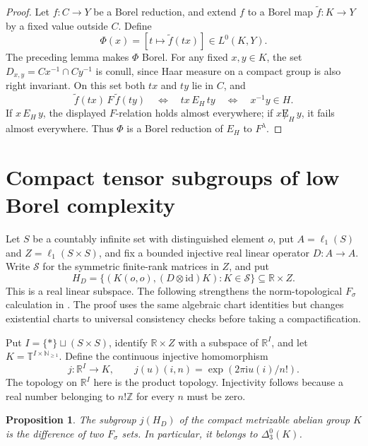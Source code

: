 \documentclass[11pt]{article}
\newtheorem{proposition}[theorem]{Proposition}
\theoremstyle{definition}
\theoremstyle{remark}
\newcommand{\R}{\mathbb R}
\newcommand{\N}{\mathbb N}
\newcommand{\T}{\mathbb T}
\newcommand{\Lzero}{L^0}
\begin{document}
\begin{proof}
Let $f:C\to Y$ be a Borel reduction, and extend $f$ to a Borel map
$\widetilde f:K\to Y$ by a fixed value outside $C$. Define
\[
 \Phi(x)=[t\mapsto\widetilde f(tx)]\in\Lzero(K,Y).
\]
The preceding lemma makes $\Phi$ Borel. For any fixed $x,y\in K$,
the set $D_{x,y}=Cx^{-1}\cap Cy^{-1}$ is conull, since Haar measure
on a compact group is also right invariant. On this set both $tx$
and $ty$ lie in $C$, and
\[
 \widetilde f(tx)\,F\,\widetilde f(ty)
 \quad\Longleftrightarrow\quad tx\,E_H\,ty
 \quad\Longleftrightarrow\quad x^{-1}y\in H.
\]
If $x\,E_H\,y$, the displayed $F$-relation holds almost everywhere;
if $x\not E_H\,y$, it fails almost everywhere. Thus $\Phi$ is a
Borel reduction of $E_H$ to $F^\lambda$.
\end{proof}


\section{Compact tensor subgroups of low Borel complexity}
Let $S$ be a countably infinite set with distinguished element $o$, put
$A=\ell_1(S)$ and $Z=\ell_1(S\times S)$, and fix a bounded injective real
linear operator $D:A\to A$. Write $\mathcal S$ for the symmetric finite-rank
matrices in $Z$, and put
\[
 H_D=\{(K(o,o),(D\otimes\mathrm{id})K):K\in\mathcal S\}
 \subseteq \R\times Z.
\]
This is a real linear subspace. The following strengthens the norm-topological
$F_\sigma$ calculation in \cite[Lemma 4.1]{Wang}. The proof
uses the same algebraic chart identities but changes existential charts to
universal consistency checks before taking a compactification.

Put $I=\{\ast\}\sqcup(S\times S)$, identify $\R\times Z$ with a subspace
of $\R^I$, and let $K=\T^{I\times\N_{\geq1}}$. Define the continuous
injective homomorphism
\[
 j:\R^I\longrightarrow K,
 \qquad j(u)(i,n)=\exp(2\pi\mathrm{i}u(i)/n!).
\]
The topology on $\R^I$ here is the product topology. Injectivity follows
because a real number belonging to $n!\mathbb Z$ for every $n$ must be zero.

\begin{proposition}
The subgroup $j(H_D)$ of the compact metrizable abelian group $K$ is the
difference of two $F_\sigma$ sets. In particular, it belongs to
$\Delta^0_3(K)$.
\end{proposition}
\end{document}
